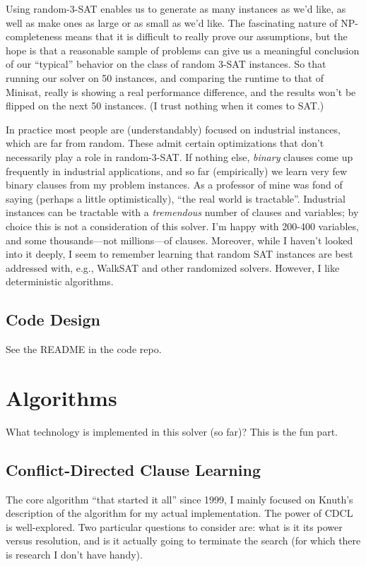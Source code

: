 \documentclass{article}
\begin{document}
Using random-3-SAT enables us to generate as many instances as we'd like, as well as make ones as large or as small as we'd like.
The fascinating nature of NP-completeness means that it is difficult to really prove our assumptions, but the hope is that a reasonable sample of problems can give us a meaningful conclusion of our ``typical'' behavior on the class of random 3-SAT instances.
So that running our solver on 50 instances, and comparing the runtime to that of Minisat, really is showing a real performance difference, and the results won't be flipped on the next 50 instances.
(I trust nothing when it comes to SAT.)

In practice most people are (understandably) focused on industrial instances, which are far from random.
These admit certain optimizations that don't necessarily play a role in random-3-SAT.
If nothing else, \emph{binary} clauses come up frequently in industrial applications, and so far (empirically) we learn very few binary clauses from my problem instances.
As a professor of mine was fond of saying (perhaps a little optimistically), ``the real world is tractable''.
Industrial instances can be tractable with a \emph{tremendous} number of clauses and variables; by choice this is not a consideration of this solver.
I'm happy with 200-400 variables, and some thousands---not millions---of clauses.
Moreover, while I haven't looked into it deeply, I seem to remember learning that random SAT instances are best addressed with, e.g., WalkSAT and other randomized solvers.
However, I like deterministic algorithms.

\subsection{Code Design}
See the README in the code repo.

\section{Algorithms}\label{sec:algorithms}
What technology is implemented in this solver (so far)?
This is the fun part.
\subsection{Conflict-Directed Clause Learning}
The core algorithm ``that started it all'' since 1999\cite{marques-silvasakallah1999},
I mainly focused on Knuth's description of the algorithm\cite{knuth2015} for my actual implementation.
The power of CDCL is well-explored.
Two particular questions to consider are: what is it its power versus resolution\cite{beamekautzsabharwal2004}, and is it actually going to terminate the search (for which there is research I don't have handy).
\end{document}
